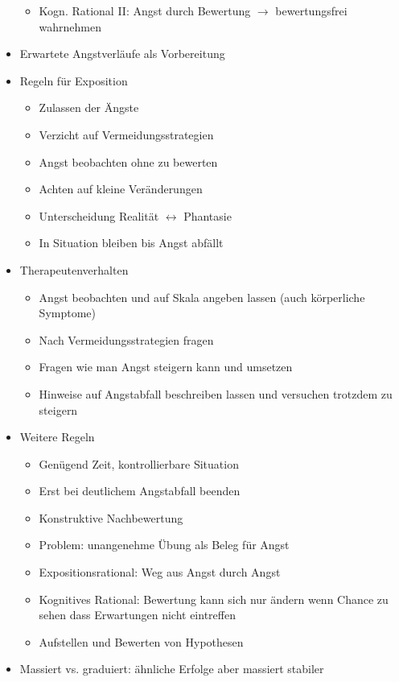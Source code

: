 \documentclass[11pt, paper=a4, twocolumn]{scrartcl}
\begin{document}
\begin{itemize}
\begin{itemize}
					\item Kogn. Rational II: Angst durch Bewertung $\rightarrow$ bewertungsfrei wahrnehmen
				\end{itemize}
			\item Erwartete Angstverläufe als Vorbereitung
			\item Regeln für Exposition
				\begin{itemize}
					\item Zulassen der Ängste
					\item Verzicht auf Vermeidungsstrategien
					\item Angst beobachten ohne zu bewerten
					\item Achten auf kleine Veränderungen
					\item Unterscheidung Realität $\leftrightarrow$ Phantasie
					\item In Situation bleiben bis Angst abfällt
				\end{itemize}
			\item Therapeutenverhalten
				\begin{itemize}
					\item Angst beobachten und auf Skala angeben lassen (auch körperliche Symptome)
					\item Nach Vermeidungsstrategien fragen
					\item Fragen wie man Angst steigern kann und umsetzen
					\item Hinweise auf Angstabfall beschreiben lassen und versuchen trotzdem zu steigern
				\end{itemize}
			\item Weitere Regeln
				\begin{itemize}
					\item Genügend Zeit, kontrollierbare Situation
					\item Erst bei deutlichem Angstabfall beenden
					\item Konstruktive Nachbewertung
					\item Problem: unangenehme Übung als Beleg für Angst
					\item Expositionsrational: Weg aus Angst durch Angst
					\item Kognitives Rational: Bewertung kann sich nur ändern wenn Chance zu sehen dass Erwartungen nicht eintreffen
					\item Aufstellen und Bewerten von Hypothesen
				\end{itemize}
			\item Massiert vs. graduiert: ähnliche Erfolge aber massiert stabiler

\end{itemize}
\end{document}
